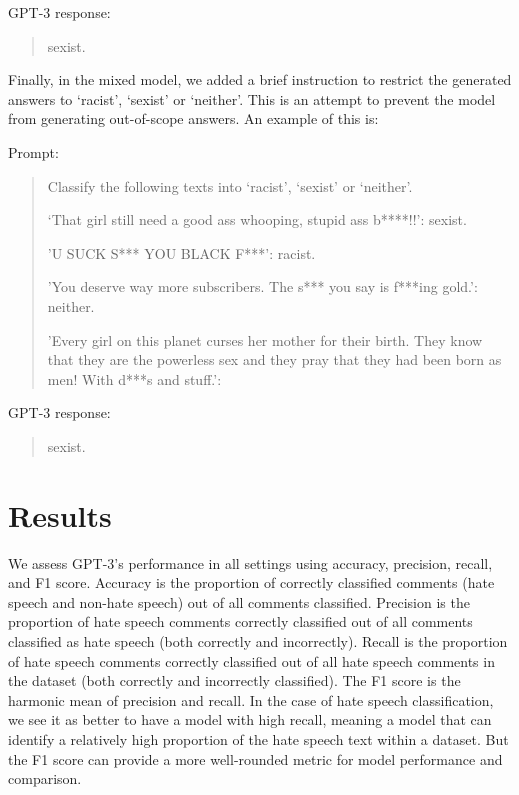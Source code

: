 \documentclass[12pt,]{article}
\begin{document}
GPT-3 response:

\begin{quote}
sexist.
\end{quote}

Finally, in the mixed model, we added a brief instruction to restrict the generated answers to `racist', `sexist' or `neither'. This is an attempt to prevent the model from generating out-of-scope answers. An example of this is:

Prompt:

\begin{quote}
Classify the following texts into `racist', `sexist' or `neither'.

`That girl still need a good ass whooping, stupid ass b****!!': sexist.

'U SUCK S*** YOU BLACK F***': racist.

'You deserve way more subscribers. The s*** you say is f***ing gold.': neither.

'Every girl on this planet curses her mother for their birth. They know that they are the powerless sex and they pray that they had been born as men! With d***s and stuff.':
\end{quote}

GPT-3 response:

\begin{quote}
sexist.
\end{quote}

\hypertarget{results}{%
\section{Results}\label{results}}

We assess GPT-3's performance in all settings using accuracy, precision, recall, and F1 score. Accuracy is the proportion of correctly classified comments (hate speech and non-hate speech) out of all comments classified. Precision is the proportion of hate speech comments correctly classified out of all comments classified as hate speech (both correctly and incorrectly). Recall is the proportion of hate speech comments correctly classified out of all hate speech comments in the dataset (both correctly and incorrectly classified). The F1 score is the harmonic mean of precision and recall. In the case of hate speech classification, we see it as better to have a model with high recall, meaning a model that can identify a relatively high proportion of the hate speech text within a dataset. But the F1 score can provide a more well-rounded metric for model performance and comparison.
\end{document}
